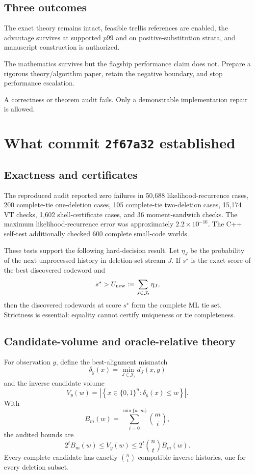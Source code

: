 \documentclass[11pt]{article}
\theoremstyle{definition}
\theoremstyle{remark}
\newcommand{\J}{\mathcal J}
\begin{document}
\subsection{Three outcomes}
\begin{description}[leftmargin=3em,style=nextline]
\item[\texttt{AUTHORIZE\_FULL\_TIT\_MANUSCRIPT\_AND\_EXTERNAL\_REVIEW}]
The exact theory remains intact, feasible trellis references are enabled, the advantage survives at supported $p99$ and on positive-substitution strata, and manuscript construction is authorized.
\item[\texttt{NARROW\_TO\_FIXED\_EDIT\_TIT\_THEORY\_ALGORITHM\_PAPER}]
The mathematics survives but the flagship performance claim does not.  Prepare a rigorous theory/algorithm paper, retain the negative boundary, and stop performance escalation.
\item[\texttt{STOP\_FLAGSHIP\_PERFORMANCE\_CLAIM}]
A correctness or theorem audit fails.  Only a demonstrable implementation repair is allowed.
\end{description}

\section{What commit \texttt{2f67a32} established}
\subsection{Exactness and certificates}
The reproduced audit reported zero failures in 50,688 likelihood-recurrence cases, 200 complete-tie one-deletion cases, 105 complete-tie two-deletion cases, 15,174 VT checks, 1,602 shell-certificate cases, and 36 moment-sandwich checks.  The maximum likelihood-recurrence error was approximately $2.2\times10^{-16}$.  The C++ self-test additionally checked 600 complete small-code worlds.

These tests support the following hard-decision result.  Let $\eta_J$ be the probability of the next unprocessed history in deletion-set stream $J$.  If $s^\star$ is the exact score of the best discovered codeword and
\[
  s^\star > U_{\rm new}:=\sum_{J\in\J_t}\eta_J,
\]
then the discovered codewords at score $s^\star$ form the complete ML tie set.  Strictness is essential: equality cannot certify uniqueness or tie completeness.

\subsection{Candidate-volume and oracle-relative theory}
For observation $y$, define the best-alignment mismatch
\[
 \delta_y(x)=\min_{J\in\J_t} d_J(x,y)
\]
and the inverse candidate volume
\[
 V_y(w)=\left|\left\{x\in\{0,1\}^n:\delta_y(x)\le w\right\}\right|.
\]
With
\[
 B_m(w)=\sum_{i=0}^{\min\{w,m\}}\binom mi,
\]
the audited bounds are
\begin{equation}
  2^t B_m(w)\le V_y(w)\le 2^t\binom nt B_m(w).
  \label{eq:volume}
\end{equation}
Every complete candidate has exactly $\binom nt$ compatible inverse histories, one for every deletion subset.
\end{document}
